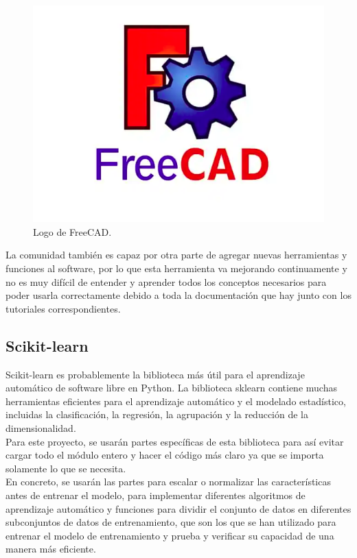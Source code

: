 \begin{figure}[H]
  \centering
  \includegraphics[scale=0.3]{figs/freecad} %
  \caption{Logo de FreeCAD.}
  \label{fig:freecad}
\end{figure}


La comunidad también es capaz por otra parte de agregar nuevas herramientas y funciones al software, por lo que esta herramienta va mejorando continuamente y no es muy difícil de entender y aprender todos los conceptos necesarios para poder usarla correctamente debido a toda la documentación que hay junto con los tutoriales correspondientes.


\subsection{Scikit-learn}
\label{subsec:sklearn}


Scikit-learn es probablemente la biblioteca más útil para el aprendizaje automático de software libre en Python. La biblioteca sklearn contiene muchas herramientas eficientes para el aprendizaje automático y el modelado estadístico, incluidas la clasificación, la regresión, la agrupación y la reducción de la dimensionalidad.\\ Para este proyecto, se usarán partes específicas de esta biblioteca para así evitar cargar todo el módulo entero y hacer el código más claro ya que se importa solamente lo que se necesita. \\

En concreto, se usarán las partes para escalar o normalizar las características antes de entrenar el modelo, para implementar diferentes algoritmos de aprendizaje automático y funciones para dividir el conjunto de datos en diferentes subconjuntos de datos de entrenamiento, que son los que se han utilizado para entrenar el modelo de entrenamiento y prueba y verificar su capacidad de una manera más eficiente.\\

